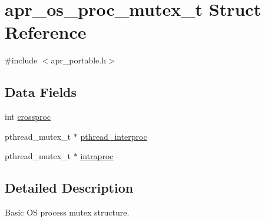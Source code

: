 \hypertarget{structapr__os__proc__mutex__t}{\section{apr\-\_\-os\-\_\-proc\-\_\-mutex\-\_\-t Struct Reference}
\label{structapr__os__proc__mutex__t}
}


{\ttfamily \#include $<$apr\-\_\-portable.\-h$>$}

\subsection*{Data Fields}
\begin{DoxyCompactItemize}
\item 
int \hyperlink{structapr__os__proc__mutex__t_ab75e29a654ba0ff0dc491b625308fb79}{crossproc}
\item 
pthread\-\_\-mutex\-\_\-t $\ast$ \hyperlink{structapr__os__proc__mutex__t_aed588bef2efc836e5a768f32638e89c1}{pthread\-\_\-interproc}
\item 
pthread\-\_\-mutex\-\_\-t $\ast$ \hyperlink{structapr__os__proc__mutex__t_aa2e01fa37b652185a0dd3fae80caa4ad}{intraproc}
\end{DoxyCompactItemize}


\subsection{Detailed Description}
Basic O\-S process mutex structure. 

